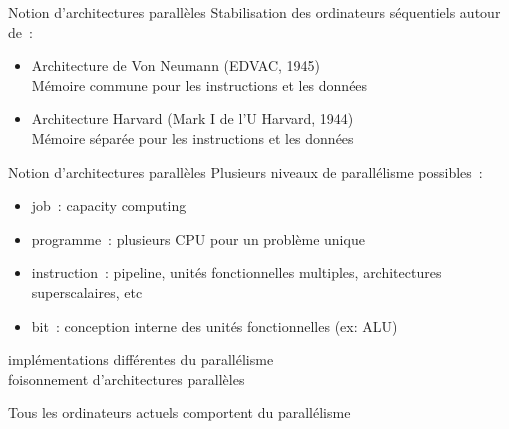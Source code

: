 

\begin {frame} {Notion d'architectures parallèles}
    Stabilisation des ordinateurs séquentiels autour de~:

    \begin {itemize}
	\item Architecture de Von Neumann (EDVAC, 1945)\\
	    Mémoire commune pour les instructions et les données
	\item Architecture Harvard (Mark I de l'U Harvard, 1944) \\
	    Mémoire séparée pour les instructions et les données
    \end {itemize}

\end {frame}

\begin {frame} {Notion d'architectures parallèles}
    Plusieurs niveaux de parallélisme possibles~:

    \begin {itemize}
	\item job~: capacity computing

	\item programme~: plusieurs CPU pour un problème unique

	\item instruction~: pipeline, unités fonctionnelles multiples,
	    architectures superscalaires, etc

	\item bit~: conception interne des unités fonctionnelles (ex: ALU)
    \end {itemize}
    \implique implémentations différentes du parallélisme
    \\
    \implique foisonnement d'architectures parallèles

    \vspace* {3mm}

    Tous les ordinateurs actuels comportent du parallélisme
\end {frame}

